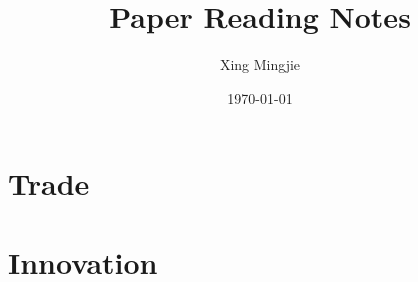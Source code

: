 \usepackage{sectsty}
\allsectionsfont{\rmfamily\bfseries\upshape} %

\usepackage[nottoc,notlof,notlot]{tocbibind} %
\usepackage[titles,subfigure]{tocloft} %
\renewcommand{\cftsecfont}{\rmfamily\mdseries\upshape}
\renewcommand{\cftsecpagefont}{\rmfamily\mdseries\upshape} %

\usepackage[colorlinks,citecolor=black,urlcolor=black,bookmarks=false,hypertexnames=true]{hyperref} 




\title{Paper Reading Notes}
\author{Xing Mingjie}
\date{\today} %


\maketitle

\tableofcontents

\newpage

\section{Trade}
	\subsection{\cite{Fernandesetal2023}}
    
    \subsection{\cite{MartinMejeanParenti2023}}

\section{Innovation}
    \subsection{\cite{Prato2022}}

    \subsection{\cite{BaiJinLu2023}}

